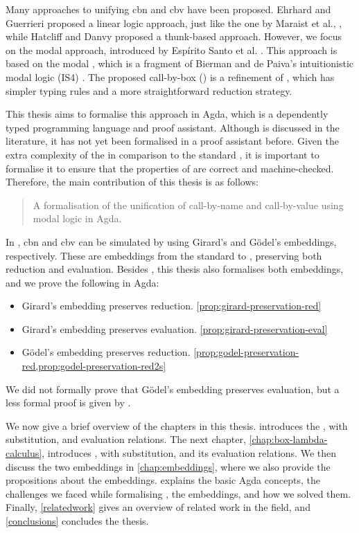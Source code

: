 Many approaches to unifying \textsf{cbn} and \textsf{cbv} have been proposed. Ehrhard and Guerrieri \cite{EhrhardGuerrieri2016} proposed a linear logic approach,
just like the one by Maraist et al., \cite{MARAIST1999175},
while Hatcliff and Danvy \cite{HATCLIFF_DANVY_1997} proposed a thunk-based approach.
However, we focus on the modal approach, introduced by Espírito Santo et al. \cite{espritosanto_et_al:LIPIcs:2019:10525}.
This approach is based on the modal \lc \labox, which is a fragment of Bierman and de Paiva's intuitionistic modal logic (\textsf{IS4}) \cite{BiermanPaiva2000}.
The proposed call-by-box \lc (\lab) is a refinement of \labox, which has simpler typing rules and a more straightforward reduction strategy.

This thesis aims to formalise this approach in Agda, which is a dependently typed programming language and proof assistant.
Although \lab is discussed in the literature, it has not yet been formalised in a proof assistant before.
Given the extra complexity of the \lab in comparison to the standard \lc, 
it is important to formalise it to ensure that the properties of \lab are correct and machine-checked.
Therefore, the main contribution of this thesis is as follows:
\begin{quote}
 A formalisation of the unification of call-by-name and call-by-value using modal logic in Agda.
\end{quote} 

In \lab, \textsf{cbn} and \textsf{cbv} can be simulated by using Girard's and Gödel's embeddings, respectively.
These are embeddings from the standard \lc to \lab, preserving both reduction and evaluation. 
Besides \lab, this thesis also formalises both embeddings, and we prove the following in Agda:

\begin{itemize}
  \item Girard's embedding preserves reduction. \cref{prop:girard-preservation-red}
  \item Girard's embedding preserves evaluation. \cref{prop:girard-preservation-eval}
  \item Gödel's embedding preserves reduction. \cref{prop:godel-preservation-red,prop:godel-preservation-red2s}
\end{itemize}

We did not formally prove that Gödel's embedding preserves evaluation, 
but a less formal proof is given by \cite{espritosanto_et_al:LIPIcs:2019:10525}.

We now give a brief overview of the chapters in this thesis.
 introduces the \lc, with substitution, \br and evaluation relations.
The next chapter, \cref{chap:box-lambda-calculus}, introduces \lab, with substitution, \br and its evaluation relations.
We then discuss the two embeddings in \cref{chap:embeddings}, where we also provide the propositions about the embeddings.
 explains the basic Agda concepts, the challenges we faced while formalising \lab, the embeddings, and how we solved them.
Finally, \cref{relatedwork} gives an overview of related work in the field, and \cref{conclusions} concludes the thesis.
